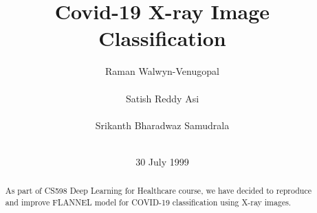 \documentclass{sigkddExp}
\begin{document}
%

\title{Covid-19 X-ray Image Classification}
%

%


\author{
%
\alignauthor Raman Walwyn-Venugopal\\
\\
\alignauthor Satish Reddy Asi\\
\\
\alignauthor Srikanth Bharadwaz Samudrala\\
\\
}
\date{30 July 1999}
\maketitle
\begin{abstract}
    As part of CS598 Deep Learning for Healthcare course, we have decided to
    reproduce and improve FLANNEL model\cite{10.1093/jamia/ocaa280} for COVID-19
    classification using X-ray images.
\end{abstract}
\end{document}
